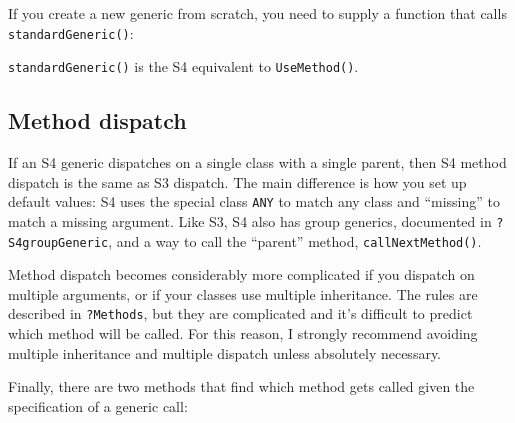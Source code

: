 If you create a new generic from scratch, you need to supply a function
that calls \texttt{standardGeneric()}:

\begin{Shaded}
\begin{Highlighting}[]
\NormalTok{(}
  \NormalTok{(}\NormalTok{)}
\NormalTok{\})}
\end{Highlighting}
\end{Shaded}

\texttt{standardGeneric()} is the S4 equivalent to \texttt{UseMethod()}.

\subsection{Method dispatch}

If an S4 generic dispatches on a single class with a single parent, then
S4 method dispatch is the same as S3 dispatch. The main difference is
how you set up default values: S4 uses the special class \texttt{ANY} to
match any class and ``missing'' to match a missing argument. Like S3, S4
also has group generics, documented in \texttt{?S4groupGeneric}, and a
way to call the ``parent'' method, \texttt{callNextMethod()}.

Method dispatch becomes considerably more complicated if you dispatch on
multiple arguments, or if your classes use multiple inheritance. The
rules are described in \texttt{?Methods}, but they are complicated and
it's difficult to predict which method will be called. For this reason,
I strongly recommend avoiding multiple inheritance and multiple dispatch
unless absolutely necessary.

Finally, there are two methods that find which method gets called given
the specification of a generic call:

\begin{Shaded}
\begin{Highlighting}[]
\NormalTok{(}\NormalTok{, }\NormalTok{(}\NormalTok{))}

\NormalTok{(}
\end{Highlighting}
\end{Shaded}

